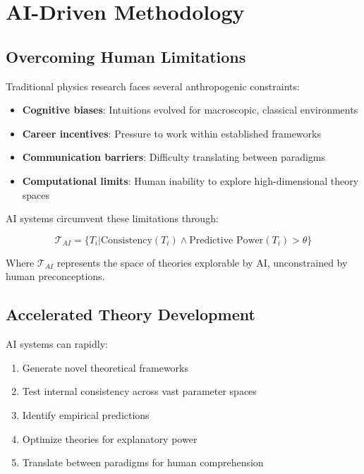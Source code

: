 \documentclass[12pt,preprint]{article}
\begin{document}
\section{AI-Driven Methodology}

\subsection{Overcoming Human Limitations}

Traditional physics research faces several anthropogenic constraints:

\begin{itemize}
\item \textbf{Cognitive biases}: Intuitions evolved for macroscopic, classical environments
\item \textbf{Career incentives}: Pressure to work within established frameworks
\item \textbf{Communication barriers}: Difficulty translating between paradigms
\item \textbf{Computational limits}: Human inability to explore high-dimensional theory spaces
\end{itemize}

AI systems circumvent these limitations through:

\begin{equation}
\mathcal{T}_{AI} = \{T_i | \text{Consistency}(T_i) \wedge \text{Predictive Power}(T_i) > \theta\}
\end{equation}

Where $\mathcal{T}_{AI}$ represents the space of theories explorable by AI, unconstrained by human preconceptions.

\subsection{Accelerated Theory Development}

AI systems can rapidly:

\begin{enumerate}
\item Generate novel theoretical frameworks
\item Test internal consistency across vast parameter spaces
\item Identify empirical predictions
\item Optimize theories for explanatory power
\item Translate between paradigms for human comprehension
\end{enumerate}
\end{document}
